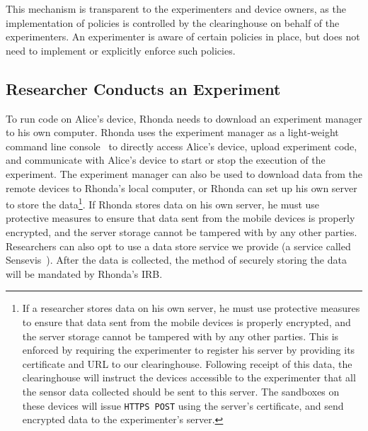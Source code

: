 This mechanism is transparent to the experimenters 
and device owners, as the implementation of policies is controlled by the 
clearinghouse on behalf of the experimenters. An experimenter is aware 
of certain policies in place, but does not need to implement or explicitly
enforce such policies. 


\subsection{Researcher Conducts an Experiment}\label{sec-emt}

To run code on Alice's device, Rhonda needs to download an experiment 
manager to his own computer.
Rhonda uses the experiment manager as a light-weight command line 
console~\cite{demo-kit} to directly access Alice's device, upload 
experiment code, and %
communicate with Alice's device to start or stop the execution of the experiment. 
The experiment manager can also be used to download data 
from the remote devices to Rhonda's local computer, or
Rhonda can set up his own server to store the data\footnote{\scriptsize
If a researcher stores data on his own server, he must use protective
measures to ensure that data sent from the mobile devices is
properly encrypted, and the server storage cannot be tampered
with by any other parties. This is enforced by requiring the experimenter to register
his server by providing its certificate and URL to our
clearinghouse. Following receipt of this data, the clearinghouse will instruct the devices
accessible to the experimenter that all the sensor data collected should be
sent to this server. The sandboxes on these devices will issue
\texttt{HTTPS POST} using the server's certificate, and send encrypted
data to the experimenter's server.}. 
If Rhonda stores data on his own server, he must use protective
measures to ensure that data sent from the mobile devices is
properly encrypted, and the server storage cannot be tampered
with by any other parties. Researchers can also opt to use a data 
store service we provide (a service called Sensevis~\cite{sensevis}). 
After the data is collected, the method of 
securely storing the data will be mandated by Rhonda's IRB.

